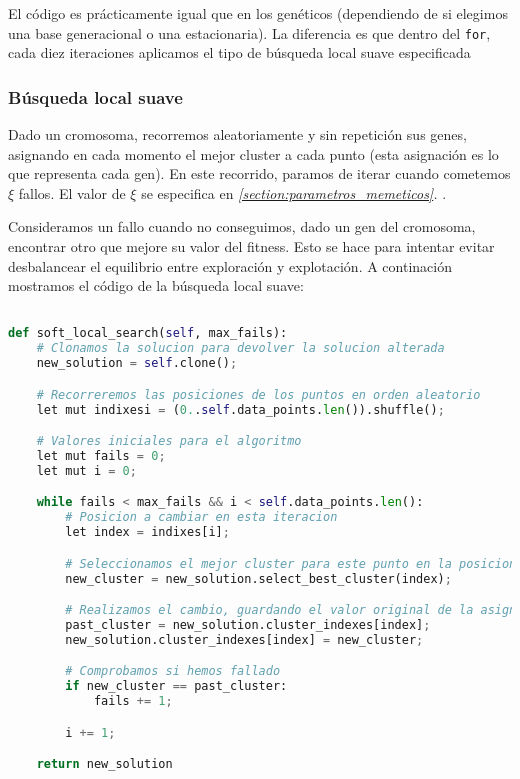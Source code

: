 \documentclass[11pt]{article}
\begin{document}
El código es prácticamente igual que en los genéticos (dependiendo de si elegimos una base generacional o una estacionaria). La diferencia es que dentro del \lstinline{for}, cada diez iteraciones aplicamos el tipo de búsqueda local suave especificada

\subsubsection{Búsqueda local suave}

Dado un cromosoma, recorremos aleatoriamente y sin repetición sus genes, asignando en cada momento el mejor cluster a cada punto (esta asignación es lo que representa cada gen). En este recorrido, paramos de iterar cuando cometemos $\xi$ fallos. El valor de $\xi$ se especifica en \emph{\ref{section:parametros_memeticos}. }.

Consideramos un fallo cuando no conseguimos, dado un gen del cromosoma, encontrar otro que mejore su valor del fitness. Esto se hace para intentar evitar desbalancear el equilibrio entre exploración y explotación. A continación mostramos el código de la búsqueda local suave:


\begin{lstlisting}[language=Python, style=Boxed]

def soft_local_search(self, max_fails):
    # Clonamos la solucion para devolver la solucion alterada
    new_solution = self.clone();

    # Recorreremos las posiciones de los puntos en orden aleatorio
    let mut indixesi = (0..self.data_points.len()).shuffle();

    # Valores iniciales para el algoritmo
    let mut fails = 0;
    let mut i = 0;

    while fails < max_fails && i < self.data_points.len():
        # Posicion a cambiar en esta iteracion
        let index = indixes[i];

        # Seleccionamos el mejor cluster para este punto en la posicion index
        new_cluster = new_solution.select_best_cluster(index);

        # Realizamos el cambio, guardando el valor original de la asignacion
        past_cluster = new_solution.cluster_indexes[index];
        new_solution.cluster_indexes[index] = new_cluster;

        # Comprobamos si hemos fallado
        if new_cluster == past_cluster:
            fails += 1;

        i += 1;

    return new_solution
\end{lstlisting}
\end{document}
